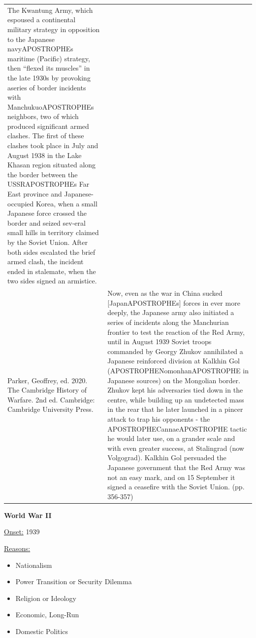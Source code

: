 {\begin{longtable}{p{}p{}}
The Kwantung Army, which espoused a continental military strategy in opposition to the Japanese navyAPOSTROPHEs maritime (Pacific) strategy, then “flexed its muscles” in the late 1930s by provoking aseries of border incidents with ManchukuoAPOSTROPHEs neighbors, two of which produced significant armed clashes. The first of these clashes took place in July and August 1938 in the Lake Khasan region situated along the border between the USSRAPOSTROPHEs Far East province and Japanese-occupied Korea, when a small Japanese force crossed the border and seized sev-eral small hills in territory claimed by the Soviet Union. After both sides escalated the brief armed clash, the incident ended in stalemate, when the two sides signed an armistice.
\\
Parker, Geoffrey, ed. 2020. The Cambridge History of Warfare. 2nd ed. Cambridge: Cambridge University Press. & Now, even as the war in China sucked [JapanAPOSTROPHEs] forces in ever more deeply, the Japanese army also initiated a series of incidents along the Manchurian frontier to test the reaction of the Red Army, until in August 1939 Soviet troops commanded by Georgy Zhukov annihilated a Japanese reinforced division at Kalkhin Gol (APOSTROPHENomonhanAPOSTROPHE in Japanese sources) on the Mongolian border. Zhukov kept his adversaries tied down in the centre, while building up an undetected mass in the rear that he later launched in a pincer attack to trap his opponents - the APOSTROPHECannaeAPOSTROPHE tactic he would later use, on a grander scale and with even greater success, at Stalingrad (now Volgograd). Kalkhin Gol persuaded the Japanese government that the Red Army was not an easy mark, and on 15 September it signed a ceasefire with the Soviet Union. (pp. 356-357)
\\
\end{longtable}}
\clearpage
         \textbf{World War II} 

          \underline{Onset:} 1939         

\underline{Reasons:}
\begin{itemize}
\item Nationalism
\item Power Transition or Security Dilemma
\item Religion or Ideology
\item Economic, Long-Run
\item Domestic Politics
\end{itemize}

